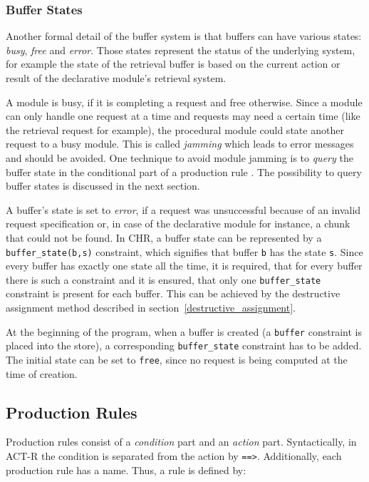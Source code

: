 \subsubsection{Buffer States}

Another formal detail of the buffer system is that buffers can have various states: \emph{busy}, \emph{free} and \emph{error}. Those states represent the status of the underlying system, for example the state of the retrieval buffer is based on the current action or result of the declarative module's retrieval system.

A module is busy, if it is completing a request and free otherwise. Since a module can only handle one request at a time and requests may need a certain time (like the retrieval request for example), the procedural module could state another request to a busy module. This is called \emph{jamming} which leads to error messages and should be avoided. One technique to avoid module jamming is to \emph{query} the buffer state in the conditional part of a production rule \cite[unit 2, p. 9]{actr_tutorial}. The possibility to query buffer states is discussed in the next section.

A buffer's state is set to \emph{error}, if a request was unsuccessful because of an invalid request specification or, in case of the declarative module for instance, a chunk that could not be found. In CHR, a buffer state can be represented by a \lstinline|buffer_state(b,s)| constraint, which signifies that buffer \lstinline|b| has the state \lstinline|s|. Since every buffer has exactly one state all the time, it is required, that for every buffer there is such a constraint and it is ensured, that only one \lstinline|buffer_state| constraint is present for each buffer. This can be achieved by the destructive assignment method described in section~\ref{destructive_assignment}. 

At the beginning of the program, when a buffer is created (a \lstinline|buffer| constraint is placed into the store), a corresponding \lstinline|buffer_state| constraint has to be added. The initial state can be set to \lstinline|free|, since no request is being computed at the time of creation.

\subsection{Production Rules}
\label{implementation:production_rules}

Production rules consist of a \emph{condition} part and an \emph{action} part. Syntactically, in ACT-R the condition is separated from the action by \lstinline|==>|. Additionally, each production rule has a name. Thus, a rule is defined by:

